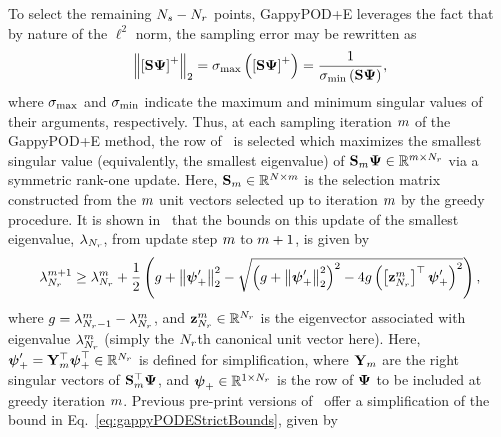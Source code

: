To select the remaining $N_s - N_r$ points, GappyPOD+E leverages the fact that by nature of the $\ell^2$ norm, the sampling error may be rewritten as
%
\begin{equation}
    \left\Vert \left[ \sampMat \deimBasis \right]^+ \right\Vert_2 = \singVal_{\text{max}} \left( \left[\sampMat \deimBasis \right]^+ \right) = \frac{1}{\singVal_{\text{min}} \left( \sampMat \deimBasis \right)},
\end{equation}
%
where $\sigma_{\text{max}}$ and $\sigma_{\text{min}}$ indicate the maximum and minimum singular values of their arguments, respectively. Thus, at each sampling iteration $m$ of the GappyPOD+E method, the row of \deimBasis\ is selected which maximizes the smallest singular value (equivalently, the smallest eigenvalue) of $\sampMat_{\greedyIdx} \deimBasis \inRTwo{\greedyIdx}{\numResModes}$ via a symmetric rank-one update. Here, $\mathbf{S}_{m} \in \mathbb{R}^{N \times m}$ is the selection matrix constructed from the $m$ unit vectors selected up to iteration $m$ by the greedy procedure. It is shown in~\cite{Peherstorfer2020} that the bounds on this update of the smallest eigenvalue, $\lambda_{N_r}$, from update step $m$ to $m+1$, is given by
%
\begin{equation}\label{eq:gappyPODEStrictBounds}
    \lambda_{N_r}^{m+1} \ge \lambda_{N_r}^{m} + \frac{1}{2} \left( g + \left\Vert \boldsymbol{\psi}'_+ \right\Vert_2^2 - \sqrt{\left( g + \left\Vert \boldsymbol{\psi}'_+ \right\Vert_2^2 \right)^2 - 4g\left( \left[\mathbf{z}_{N_r}^{m} \right]^\top \boldsymbol{\psi}'_+ \right)^2} \right),
\end{equation}
%
where $g = \lambda_{N_r-1}^{m} - \lambda_{N_r}^{m}$, and $\mathbf{z}_{N_r}^{m} \in \mathbb{R}^{N_r}$ is the eigenvector associated with eigenvalue $\lambda_{N_r}^{m}$ (simply the $N_r$th canonical unit vector here). Here, $\deimBasisREvecRow = \rightEvecMat_{\greedyIdx}^\top \deimBasisRowUpdate^\top \inROne{\numResModes}$ is defined for simplification, where $\rightEvecMat_{\greedyIdx}$ are the right singular vectors of $\sampMat_{\greedyIdx}^\top \deimBasis$, and $\boldsymbol{\psi}_+ \in \mathbb{R}^{1 \times N_r}$ is the row of $\deimBasis$ to be included at greedy iteration $m$. Previous pre-print versions of~\cite{Peherstorfer2020} offer a simplification of the bound in Eq.~\ref{eq:gappyPODEStrictBounds}, given by
